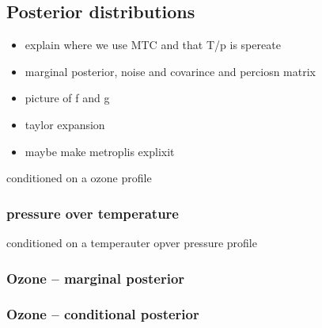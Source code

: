 \subsection{Posterior distributions}
\begin{itemize}
	\item explain where we use MTC and that T/p is spereate
	\item marginal posterior, noise and covarince and perciosn matrix
	\item picture of f and g
	\item taylor expansion
	\item maybe make  metroplis explixit
\end{itemize}
conditioned on a ozone profile
\subsubsection{pressure over temperature}

conditioned on a temperauter opver pressure profile
\subsubsection{Ozone -- marginal posterior}

\subsubsection{Ozone -- conditional posterior}



